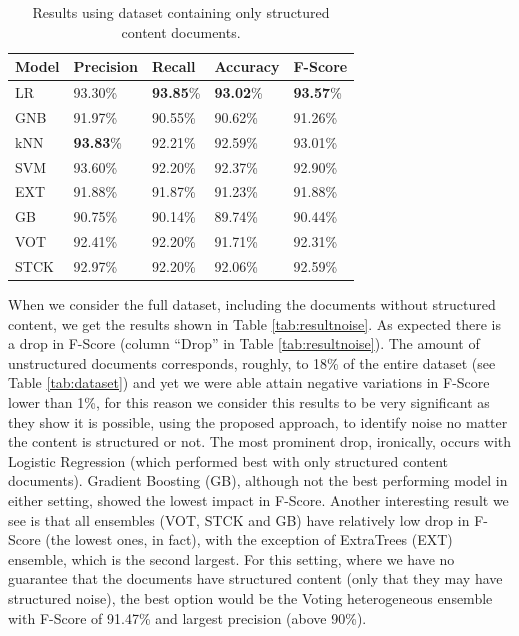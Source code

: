 \begin{table}[h]
\centering
\caption{Results using dataset containing only structured content documents.}
\label{tab:result}
\begin{tabular}{| l | l | l | l | l |}
\hline
Model & Precision & Recall & Accuracy & F-Score \\ \hline
LR   & 93.30\% & \textbf{93.85}\% & \textbf{93.02}\% & \textbf{93.57}\% \\
GNB  & 91.97\% & 90.55\% & 90.62\% & 91.26\% \\
kNN  & \textbf{93.83}\% & 92.21\% & 92.59\% & 93.01\% \\
SVM  & 93.60\% & 92.20\% & 92.37\% & 92.90\% \\
EXT  & 91.88\% & 91.87\% & 91.23\% & 91.88\% \\
GB   & 90.75\% & 90.14\% & 89.74\% & 90.44\% \\
VOT  & 92.41\% & 92.20\% & 91.71\% & 92.31\% \\
STCK & 92.97\% & 92.20\% & 92.06\% & 92.59\% \\
\hline
\end{tabular}
\end{table}

When we consider the full dataset, including the documents without structured
content, we get the results shown in Table \ref{tab:resultnoise}. As expected
there is a drop in F-Score (column ``Drop'' in Table \ref{tab:resultnoise}). The
amount of unstructured documents corresponds, roughly, to 18\% of the entire
dataset (see Table \ref{tab:dataset}) and yet we were able attain negative
variations in F-Score lower than 1\%, for this reason we consider this results
to be very significant as they show it is possible, using the proposed approach,
to identify noise no matter the content is structured or not. The most prominent
drop, ironically, occurs with Logistic Regression (which performed best with
only structured content documents).
Gradient Boosting (GB), although not the best performing model in either
setting, showed the lowest impact in F-Score. Another interesting result we see
is that all ensembles (VOT, STCK and GB) have relatively low drop in F-Score
(the lowest ones, in fact), with the exception of ExtraTrees (EXT) ensemble,
which is the second largest.
For this setting, where we have no guarantee that the documents have structured
content (only that they may have structured noise), the best option would be the
Voting heterogeneous ensemble with F-Score of 91.47\% and largest precision
(above 90\%).

